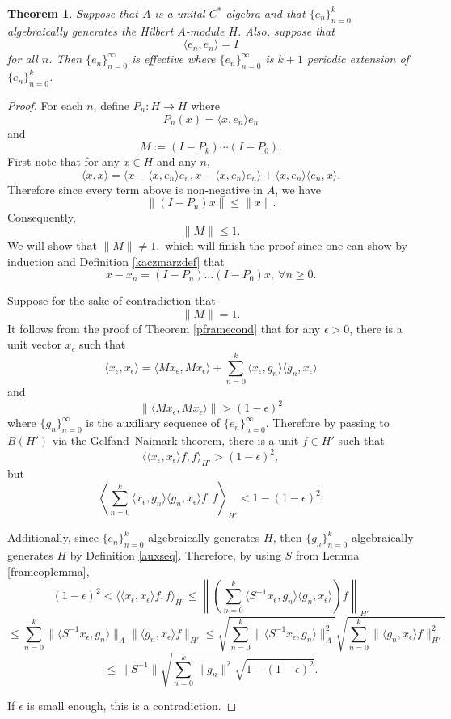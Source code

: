 \documentclass[11pt]{amsart}
\newtheorem{thm}{Theorem}[section]
\theoremstyle{definition}
\numberwithin{equation}{section}
\begin{document}
\begin{thm}\label{finite-dimcase}
Suppose that $A$ is a unital $C^{*}$ algebra and that $\{e_{n}\}_{n=0}^{k}$ algebraically generates the Hilbert $A$-module $H$. Also, suppose that $$\langle e_{n},e_{n}\rangle =I$$ for all $n$. Then $\{e_{n}\}_{n=0}^{\infty}$ is effective where $\{e_{n}\}_{n=0}^{\infty}$ is $k+1$ periodic extension of $\{e_{n}\}_{n=0}^{k}$.  
\end{thm}
\begin{proof}
For each $n$, define $P_{n}: H\to H$ where $$P_{n}(x)=\langle x,e_{n}\rangle e_{n}$$ and 
$$M:=(I-P_{k})\cdots (I-P_{0}).$$ First note that for any $x\in H$ and any $n$,
$$\langle x,x\rangle =\langle x-\langle x,e_{n}\rangle e_{n}, x-\langle x,e_{n}\rangle e_{n}\rangle+\langle x,e_{n}\rangle \langle e_{n}, x\rangle.$$
Therefore since every term above is non-negative in $A$, we have $$\|(I-P_{n})x\|\leq \|x\|.$$
Consequently, $$\|M\|\leq 1.$$
We will show that $\|M\| \neq 1,$ which will finish the proof since one can show by induction and Definition \ref{kaczmarzdef} that $$x-x_{n}=(I-P_{n})\dots (I-P_{0})x, \ \forall n\geq0.$$

Suppose for the sake of contradiction that $$\|M\| =1.$$
It follows from the proof of Theorem \ref{pframecond} that for any $\epsilon>0$, there is a unit vector $x_{\epsilon}$ such that
$$\langle x_{\epsilon}, x_{\epsilon}\rangle=\langle Mx_{\epsilon}, Mx_{\epsilon}\rangle+\sum_{n=0}^{k}\langle x_{\epsilon}, g_{n}\rangle \langle g_{n},x_{\epsilon} \rangle$$
and $$\|\langle Mx_{\epsilon}, Mx_{\epsilon}\rangle \|>(1-\epsilon)^{2}$$ where $\{g_{n}\}_{n=0}^{\infty}$ is the auxiliary sequence of $\{e_{n}\}_{n=0}^{\infty}$. Therefore by passing to $B(H')$ via the Gelfand–Naimark theorem, there is a unit $f \in H'$ such that
$$\langle \langle x_{\epsilon}, x_{\epsilon}\rangle f, f\rangle_{H'}>(1-\epsilon)^{2} ,$$
but 
$$\left\langle \sum_{n=0}^{k}\langle x_{\epsilon}, g_{n}\rangle \langle g_{n},x_{\epsilon}\rangle f, f \right\rangle_{H'}< 1-(1-\epsilon)^{2}.$$

Additionally, since $\{e_{n}\}_{n=0}^{k}$ algebraically generates $H$, then $\{g_{n}\}_{n=0}^{k}$ algebraically generates $H$ by Definition \ref{auxseq}.
Therefore, by using $S$ from Lemma \ref{frameoplemma},
$$(1-\epsilon)^{2}<\langle \langle x_{\epsilon}, x_{\epsilon}\rangle f, f\rangle_{H'}\leq \left\| \left(\sum_{n=0}^{k}\langle S^{-1}x_{\epsilon}, g_{n}\rangle \langle g_{n},x_{\epsilon}\rangle \right) f \right\|_{H'}$$
$$\leq \sum_{n=0}^{k}\|\langle S^{-1}x_{\epsilon}, g_{n}\rangle \|_{A} \|\langle g_{n},x_{\epsilon}\rangle f\|_{H'}\leq \sqrt{\sum_{n=0}^{k}\|\langle S^{-1}x_{\epsilon}, g_{n}\rangle \|_{A}^{2}} \sqrt{\sum_{n=0}^{k}\|\langle g_{n},x_{\epsilon}\rangle f \|_{H'}^{2}}$$
$$\leq \|S^{-1}\|\sqrt{\sum_{n=0}^{k}\|g_{n}\|^{2}}\sqrt{1-(1-\epsilon)^{2}}.$$

If $\epsilon$ is small enough, this is a contradiction.
\end{proof}
\end{document}
